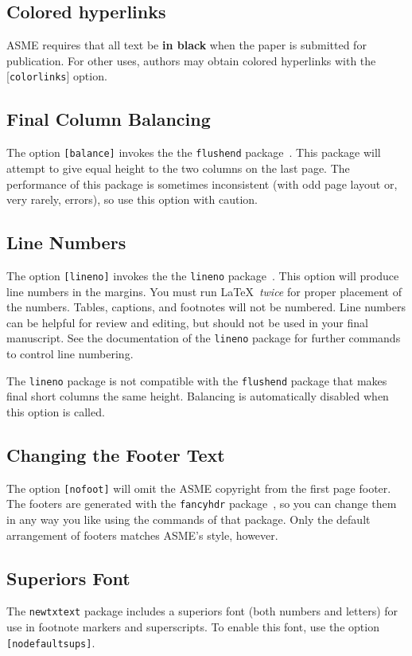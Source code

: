 \documentclass[varvw,largesc,upint,mathalfa=cal=euler,hyphenate,balance,lang-second=french,lang=english,colorlinks]{asmeconf} %
\begin{document}
\subsection{Colored hyperlinks}
ASME requires that all text be \textbf{in black} when the paper is submitted for publication.  For other uses, authors may
obtain colored hyperlinks with the [\texttt{colorlinks}] option.

\subsection{Final Column Balancing} The option \texttt{[balance]} invokes the the \texttt{flushend} package~\cite{tolusis}.
This package will attempt to give equal height to the two columns on the last page. The performance of this package is sometimes inconsistent (with odd page layout or, very rarely, errors), so use this option with caution.

\subsection{Line Numbers} The option \texttt{[lineno]} invokes the the \texttt{lineno} package~\cite{bottcher}. This option will produce line numbers in the margins. You must run \LaTeX\ \textit{twice} for proper placement of the numbers. Tables, captions, and footnotes will not be numbered.  Line numbers can be helpful for review and editing, but should not be used in your final manuscript. See the documentation of the \texttt{lineno} package for further commands to control line numbering. 

The \texttt{lineno} package is not compatible with the \texttt{flushend} package that makes final short columns the same height. Balancing is automatically disabled when this option is called. 

\subsection{Changing the Footer Text} The option \texttt{[nofoot]} will omit the ASME copyright from the first page footer. 
The footers are generated with the \texttt{fancyhdr} package~\cite{oostrum}, so you can change them in any way you like using the commands of that package. Only the default arrangement of footers matches ASME's style, however.

\subsection{Superiors Font} The \texttt{newtxtext} package includes a superiors font (both numbers and letters) for use in footnote markers and superscripts. To enable this font, use the option \texttt{[nodefaultsups]}. 
\end{document}
